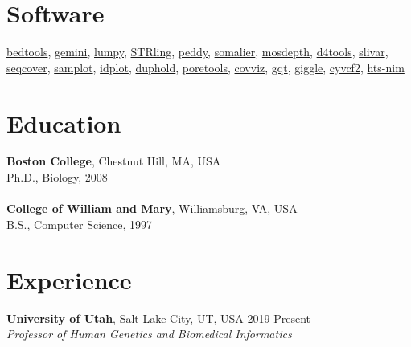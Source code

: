 \documentclass[margin,line]{cv}
\begin{document}
\begin{resume}
    \section{\mysidestyle Software} 
    \href{https://bedtools.readthedocs.io/en/latest/}{bedtools},
    \href{https://gemini.readthedocs.io/en/latest/}{gemini},
    \href{https://github.com/arq5x/lumpy-sv}{lumpy},
    \href{https://github.com/quinlan-lab/STRling}{STRling},
    \href{https://github.com/brentp/peddy}{peddy},
    \href{https://github.com/brentp/somalier}{somalier},
    \href{https://github.com/brentp/mosdepth}{mosdepth},
    \href{https://github.com/38/d4-format}{d4tools},
    \href{https://github.com/brentp/slivar}{slivar},
    \href{https://github.com/brentp/seqcover}{seqcover},
    \href{https://github.com/ryanlayer/samplot}{samplot},
    \href{https://github.com/brwnj/idplot}{idplot},
    \href{https://github.com/brentp/duphold}{duphold},
    \href{https://github.com/brentp/poretools}{poretools},
    \href{https://github.com/brwnj/covviz}{covviz},
    \href{https://github.com/ryanlayer/gqt}{gqt},
    \href{https://github.com/ryanlayer/giggle}{giggle},
    \href{https://github.com/brentp/cyvcf2}{cyvcf2},
    \href{https://github.com/brentp/hts-nim}{hts-nim}

    
    \section{\mysidestyle Education}

    \textbf{Boston College}, Chestnut Hill, MA, USA\\
    Ph.D., Biology, 2008\\
    \\
    \textbf{College of William and Mary}, Williamsburg, VA, USA\\
    B.S., Computer Science, 1997

    \section{\mysidestyle Experience}

    \textbf{University of Utah}, Salt Lake City, UT, USA                               \hfill   2019-Present\\
    \textit{Professor of Human Genetics and Biomedical Informatics}                                         


\end{resume}
\end{document}
